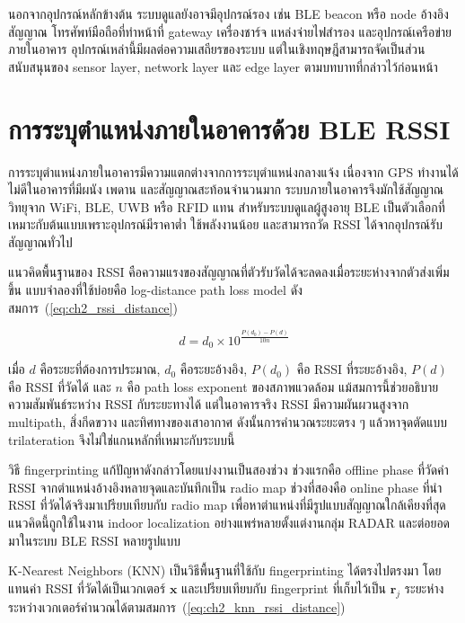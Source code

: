 นอกจากอุปกรณ์หลักข้างต้น ระบบดูแลยังอาจมีอุปกรณ์รอง เช่น BLE beacon หรือ node อ้างอิงสัญญาณ โทรศัพท์มือถือที่ทำหน้าที่ gateway เครื่องชาร์จ แหล่งจ่ายไฟสำรอง และอุปกรณ์เครือข่ายภายในอาคาร อุปกรณ์เหล่านี้มีผลต่อความเสถียรของระบบ แต่ในเชิงทฤษฎีสามารถจัดเป็นส่วนสนับสนุนของ sensor layer, network layer และ edge layer ตามบทบาทที่กล่าวไว้ก่อนหน้า

\FloatBarrier

\section{การระบุตำแหน่งภายในอาคารด้วย BLE RSSI}
\label{sec:ch2_ble_rssi_localization}

การระบุตำแหน่งภายในอาคารมีความแตกต่างจากการระบุตำแหน่งกลางแจ้ง เนื่องจาก GPS ทำงานได้ไม่ดีในอาคารที่มีผนัง เพดาน และสัญญาณสะท้อนจำนวนมาก ระบบภายในอาคารจึงมักใช้สัญญาณวิทยุจาก WiFi, BLE, UWB หรือ RFID แทน สำหรับระบบดูแลผู้สูงอายุ BLE เป็นตัวเลือกที่เหมาะกับต้นแบบเพราะอุปกรณ์มีราคาต่ำ ใช้พลังงานน้อย และสามารถวัด RSSI ได้จากอุปกรณ์รับสัญญาณทั่วไป

แนวคิดพื้นฐานของ RSSI คือความแรงของสัญญาณที่ตัวรับวัดได้จะลดลงเมื่อระยะห่างจากตัวส่งเพิ่มขึ้น แบบจำลองที่ใช้บ่อยคือ log-distance path loss model ดังสมการ~(\ref{eq:ch2_rssi_distance}) \cite{Kaemarungsi2012RSSIAnalysis}

\begin{equation}
    d = d_0 \times 10^{\frac{P(d_0)-P(d)}{10n}}
    \label{eq:ch2_rssi_distance}
\end{equation}

เมื่อ $d$ คือระยะที่ต้องการประมาณ, $d_0$ คือระยะอ้างอิง, $P(d_0)$ คือ RSSI ที่ระยะอ้างอิง, $P(d)$ คือ RSSI ที่วัดได้ และ $n$ คือ path loss exponent ของสภาพแวดล้อม แม้สมการนี้ช่วยอธิบายความสัมพันธ์ระหว่าง RSSI กับระยะทางได้ แต่ในอาคารจริง RSSI มีความผันผวนสูงจาก multipath, สิ่งกีดขวาง และทิศทางของเสาอากาศ ดังนั้นการคำนวณระยะตรง ๆ แล้วหาจุดตัดแบบ trilateration จึงไม่ใช่แกนหลักที่เหมาะกับระบบนี้

วิธี fingerprinting แก้ปัญหาดังกล่าวโดยแบ่งงานเป็นสองช่วง ช่วงแรกคือ offline phase ที่วัดค่า RSSI จากตำแหน่งอ้างอิงหลายจุดและบันทึกเป็น radio map ช่วงที่สองคือ online phase ที่นำ RSSI ที่วัดได้จริงมาเปรียบเทียบกับ radio map เพื่อหาตำแหน่งที่มีรูปแบบสัญญาณใกล้เคียงที่สุด แนวคิดนี้ถูกใช้ในงาน indoor localization อย่างแพร่หลายตั้งแต่งานกลุ่ม RADAR และต่อยอดมาในระบบ BLE RSSI หลายรูปแบบ \cite{Bahl2000RADAR}

K-Nearest Neighbors (KNN) เป็นวิธีพื้นฐานที่ใช้กับ fingerprinting ได้ตรงไปตรงมา โดยแทนค่า RSSI ที่วัดได้เป็นเวกเตอร์ $\mathbf{x}$ และเปรียบเทียบกับ fingerprint ที่เก็บไว้เป็น $\mathbf{r}_j$ ระยะห่างระหว่างเวกเตอร์คำนวณได้ตามสมการ~(\ref{eq:ch2_knn_rssi_distance}) \cite{Cover1967NearestNeighbor}

